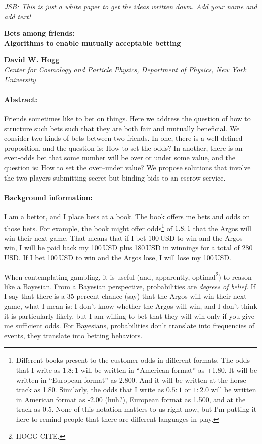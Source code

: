 \documentclass{article}
\begin{document}
\noindent
\textit{JSB: This is just a white paper to get the ideas written down. Add your name and add text!}

\bigskip
\noindent
\textbf{Bets among friends:\\ Algorithms to enable mutually acceptable betting}

\medskip
\noindent
\textbf{David W. Hogg}\\
\textit{Center for Cosmology and Particle Physics, Department of Physics, New York University}

\paragraph{Abstract:}
Friends sometimes like to bet on things.
Here we address the question of how to structure such bets such that they are both fair and mutually beneficial.
We consider two kinds of bets between two friends.
In one, there is a well-defined proposition, and the question is:
How to set the odds?
In another, there is an even-odds bet that some number will be over or under some value, and the question is:
How to set the over--under value?
We propose solutions that involve the two players submitting secret but binding bids to an escrow service.

\paragraph{Background information:}
I am a bettor, and I place bets at a book.
The book offers me bets and odds on those bets.
For example, the book might offer odds\footnote{%
Different books present to the customer odds in different formats.
The odds that I write as $1.8:1$ will be written in ``American format'' as +1.80.
It will be written in ``European format'' as 2.800.
And it will be written at the horse track as 1.80.
Similarly, the odds that I write as $0.5:1$ or $1:2.0$ will be written in American format as -2.00 (huh?),
European format as 1.500,
and at the track as 0.5.
None of this notation matters to us right now, but I'm putting it here to remind people that there are
different languages in play.}
of $1.8:1$ that the Argos will win their next game.
That means that if I bet 100\,USD to win and the Argos win, I will be paid back my 100\,USD plus 180\,USD in winnings for a total of 280\,USD.
If I bet 100\,USD to win and the Argos lose, I will lose my 100\,USD.

When contemplating gambling, it is useful (and, apparently, optimal\footnote{HOGG CITE.}) to reason like a Bayesian.
From a Bayesian perspective, probabilities are \emph{degrees of belief}.
If I say that there is a 35-percent chance (say) that the Argos will win their next game, what I mean is:
I don't know whether the Argos will win, and I don't think it is particularly likely,
but I am willing to bet that they will win only if you give me sufficient odds.
For Bayesians, probabilities don't translate into frequencies of events, they translate into betting
behaviors.
\end{document}
